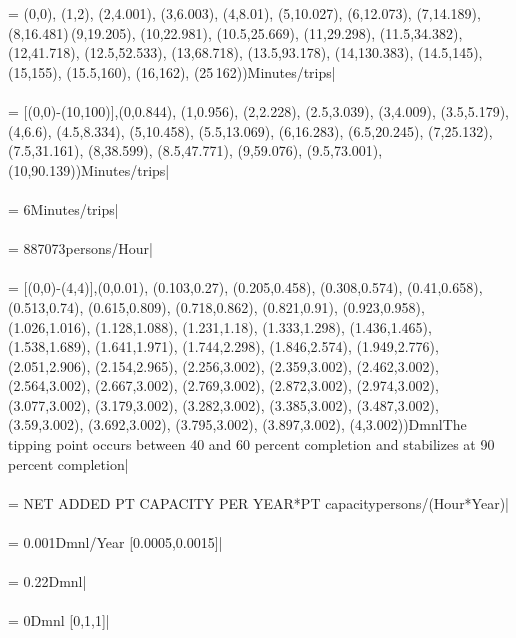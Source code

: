  = {\small (0,0), (1,2), (2,4.001), (3,6.003), (4,8.01), (5,10.027), (6,12.073), (7,14.189), (8,16.481)\,(9,19.205), (10,22.981), (10.5,25.669), (11,29.298), (11.5,34.382), (12,41.718), (12.5,52.533), (13,68.718), (13.5,93.178), (14,130.383), (14.5,145), (15,155), (15.5,160), (16,162), (25\,162))Minutes/trips|} \\ \\ 
 = {\small [(0,0)-(10,100)],(0,0.844), (1,0.956), (2,2.228), (2.5,3.039), (3,4.009), (3.5,5.179), (4,6.6), (4.5,8.334), (5,10.458), (5.5,13.069), (6,16.283), (6.5,20.245), (7,25.132), (7.5,31.161), (8,38.599), (8.5,47.771), (9,59.076), (9.5,73.001), (10,90.139))Minutes/trips|} \\ \\ 
 = {\small 6Minutes/trips|} \\ \\ 
 = {\small 887073persons/Hour|} \\ \\ 
 = {\small [(0,0)-(4,4)],(0,0.01), (0.103,0.27), (0.205,0.458), (0.308,0.574), (0.41,0.658), (0.513,0.74), (0.615,0.809), (0.718,0.862), (0.821,0.91), (0.923,0.958), (1.026,1.016), (1.128,1.088), (1.231,1.18), (1.333,1.298), (1.436,1.465), (1.538,1.689), (1.641,1.971), (1.744,2.298), (1.846,2.574), (1.949,2.776), (2.051,2.906), (2.154,2.965), (2.256,3.002), (2.359,3.002), (2.462,3.002), (2.564,3.002), (2.667,3.002), (2.769,3.002), (2.872,3.002), (2.974,3.002), (3.077,3.002), (3.179,3.002), (3.282,3.002), (3.385,3.002), (3.487,3.002), (3.59,3.002), (3.692,3.002), (3.795,3.002), (3.897,3.002), (4,3.002))DmnlThe tipping point occurs between 40 and 60 percent completion and stabilizes at 90 percent completion|} \\ \\ 
 = {\small NET ADDED PT CAPACITY PER YEAR*PT capacitypersons/(Hour*Year)|} \\ \\ 
 = {\small 0.001Dmnl/Year [0.0005,0.0015]|} \\ \\ 
 = {\small 0.22Dmnl|} \\ \\ 
 = {\small 0Dmnl [0,1,1]|} \\ \\ 
